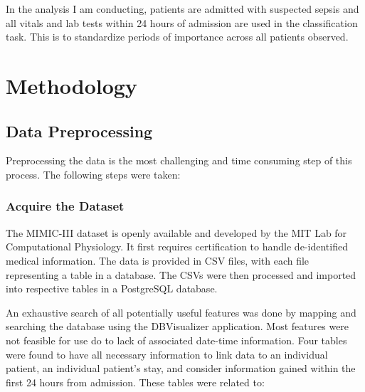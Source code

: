 \documentclass[11pt]{article}
\begin{document}
	In the analysis I am conducting, patients are admitted with suspected sepsis and all vitals and lab tests within 24 hours of admission are used in the classification task. This is to standardize periods of importance across all patients observed.
	
	\section{Methodology}
	\subsection{Data Preprocessing}
	Preprocessing the data is the most challenging and time consuming step of this process. The following steps were taken:
	
		\subsubsection{Acquire the Dataset}
		The MIMIC-III dataset is openly available and developed by the MIT Lab for Computational Physiology. It first requires certification to handle de-identified medical information. The data is provided in CSV files, with each file representing a table in a database. The CSVs were then processed and imported into respective tables in a PostgreSQL database.
		
		An exhaustive search of all potentially useful features was done by mapping and searching the database using the DBVisualizer application. Most features were not feasible for use do to lack of associated date-time information. Four tables were found to have all necessary information to link data to an individual patient, an individual patient's stay, and consider information gained within the first 24 hours from admission. These tables were related to:
		
\end{document}
